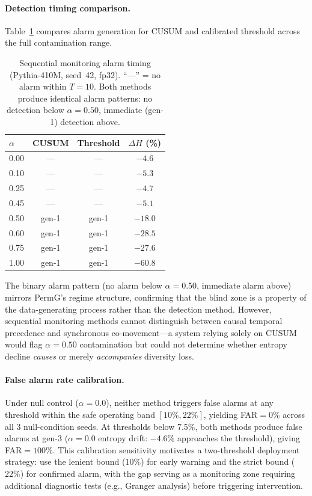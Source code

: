 \paragraph{Detection timing comparison.}
Table~\ref{tab:sequential_timing} compares alarm generation for CUSUM and calibrated threshold across the full contamination range.

\begin{table}[H]
\centering
\small
\caption{Sequential monitoring alarm timing (Pythia-410M, seed~42, fp32). ``---'' = no alarm within $T{=}10$. Both methods produce identical alarm patterns: no detection below $\alpha{=}0.50$, immediate (gen-1) detection above.}
\label{tab:sequential_timing}
\begin{tabular}{@{}lccc@{}}
\toprule
$\alpha$ & CUSUM & Threshold & $\Delta H$ (\%) \\
\midrule
0.00 & --- & --- & $-4.6$ \\
0.10 & --- & --- & $-5.3$ \\
0.25 & --- & --- & $-4.7$ \\
0.45 & --- & --- & $-5.1$ \\
0.50 & gen-1 & gen-1 & $-18.0$ \\
0.60 & gen-1 & gen-1 & $-28.5$ \\
0.75 & gen-1 & gen-1 & $-27.6$ \\
1.00 & gen-1 & gen-1 & $-60.8$ \\
\bottomrule
\end{tabular}
\end{table}

The binary alarm pattern (no alarm below $\alpha{=}0.50$, immediate alarm above) mirrors PermG's regime structure, confirming that the blind zone is a property of the data-generating process rather than the detection method.
However, sequential monitoring methods cannot distinguish between causal temporal precedence and synchronous co-movement---a system relying solely on CUSUM would flag $\alpha{=}0.50$ contamination but could not determine whether entropy decline \emph{causes} or merely \emph{accompanies} diversity loss.

\paragraph{False alarm rate calibration.}
Under null control ($\alpha{=}0.0$), neither method triggers false alarms at any threshold within the safe operating band $[10\%, 22\%]$, yielding FAR${=}0\%$ across all 3 null-condition seeds.
At thresholds below 7.5\%, both methods produce false alarms at gen-3 ($\alpha{=}0.0$ entropy drift: $-4.6\%$ approaches the threshold), giving FAR${=}100\%$.
This calibration sensitivity motivates a two-threshold deployment strategy: use the lenient bound ($10\%$) for early warning and the strict bound ($22\%$) for confirmed alarm, with the gap serving as a monitoring zone requiring additional diagnostic tests (e.g., Granger analysis) before triggering intervention.

